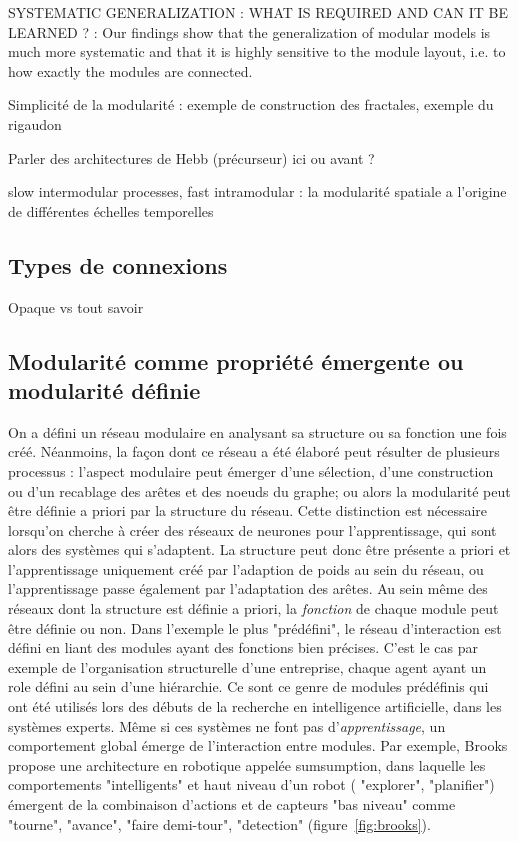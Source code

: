 SYSTEMATIC GENERALIZATION : WHAT IS REQUIRED
AND CAN IT BE LEARNED ? : 
Our findings show that the generalization of modular models is much more systematic and that it is highly sensitive to the module layout, i.e. to how exactly the modules are connected.

Simplicité de la modularité : exemple de construction des fractales, exemple du rigaudon

Parler des architectures de Hebb (précurseur) ici ou avant ?

slow intermodular processes, fast intramodular : la modularité spatiale a l'origine de différentes échelles temporelles \cite{Pan2009ModularityPS}


\subsection{Types de connexions}

Opaque vs tout savoir


\subsection{Modularité comme propriété émergente ou modularité définie}

On a défini un réseau modulaire en analysant sa structure ou sa fonction une fois créé. Néanmoins, la façon dont ce réseau a été élaboré peut résulter de plusieurs processus : l'aspect modulaire peut émerger d'une sélection, d'une construction ou d'un recablage des arêtes et des noeuds du graphe; ou alors la modularité peut être définie a priori par la structure du réseau. Cette distinction est nécessaire lorsqu'on cherche à créer des réseaux de neurones pour l'apprentissage, qui sont alors des systèmes qui s'adaptent. La structure peut donc être présente a priori et l'apprentissage uniquement créé par l'adaption de poids au sein du réseau, ou l'apprentissage passe également par l'adaptation des arêtes.
Au sein même des réseaux dont la structure est définie a priori, la \emph{fonction} de chaque module peut être définie ou non. Dans l'exemple le plus "prédéfini", le réseau d'interaction est défini en liant des modules ayant des fonctions bien précises. C'est le cas par exemple de l'organisation structurelle d'une entreprise, chaque agent ayant un role défini au sein d'une hiérarchie. Ce sont ce genre de modules prédéfinis qui ont été utilisés lors des débuts de la recherche en intelligence artificielle, dans les systèmes experts. Même si ces systèmes ne font pas d'\emph{apprentissage}, un comportement global émerge de l'interaction entre modules. Par exemple, Brooks \cite{brooks_sumsumption_85} propose une architecture en robotique appelée sumsumption, dans laquelle les comportements "intelligents" et haut niveau d'un robot ( "explorer", "planifier") émergent de la combinaison d'actions et de capteurs "bas niveau" comme "tourne", "avance", "faire demi-tour", "detection" (figure~\ref{fig:brooks}).

